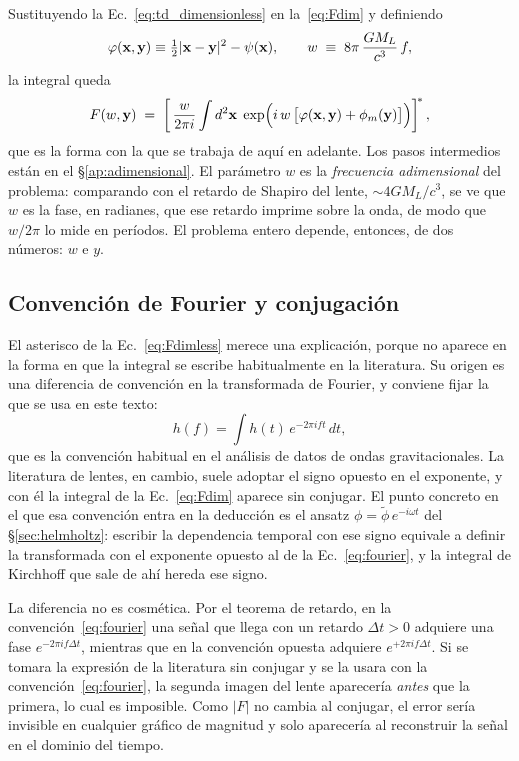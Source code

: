 \documentclass[11pt,a4paper,openany]{book}
\begin{document}
Sustituyendo la Ec.~\eqref{eq:td_dimensionless} en la~\eqref{eq:Fdim} y
definiendo
\begin{equation}
  \varphi(\vb x,\vb y)\equiv\tfrac12|\vb x-\vb y|^{2}-\psi(\vb x),
  \qquad
  w\;\equiv\;8\pi\,\frac{GM_L}{c^{3}}\,f ,
  \label{eq:wdef}
\end{equation}
la integral queda
\begin{equation}
  F(w,\vb y)\;=\;\left[\,\frac{w}{2\pi i}\int d^{2}\vb x\;
  \exp\!\Big(i\,w\,\big[\varphi(\vb x,\vb y)+\phi_m(\vb y)\big]\Big)\right]^{\!*} ,
  \label{eq:Fdimless}
\end{equation}
que es la forma con la que se trabaja de aqu\'i en adelante. Los pasos
intermedios est\'an en el \S\ref{ap:adimensional}. El par\'ametro $w$ es la
\emph{frecuencia adimensional} del problema: comparando con el retardo de
Shapiro del lente, $\sim4GM_L/c^{3}$, se ve que $w$ es la fase, en radianes,
que ese retardo imprime sobre la onda, de modo que $w/2\pi$ lo mide en
per\'iodos. El problema entero depende, entonces, de
dos n\'umeros: $w$ e $y$.

\subsection*{Convenci\'on de Fourier y conjugaci\'on}

El asterisco de la Ec.~\eqref{eq:Fdimless} merece una explicaci\'on, porque no
aparece en la forma en que la integral se escribe habitualmente en la
literatura. Su origen es una diferencia de convenci\'on en la transformada de
Fourier, y conviene fijar la que se usa en este texto:
\begin{equation}
  h(f)=\int h(t)\,e^{-2\pi i ft}\,dt ,
  \label{eq:fourier}
\end{equation}
que es la convenci\'on habitual en el an\'alisis de datos de ondas
gravitacionales. La literatura de lentes, en cambio, suele adoptar el signo
opuesto en el exponente, y con \'el la integral de la
Ec.~\eqref{eq:Fdim} aparece sin conjugar. El punto concreto en el que esa
convenci\'on entra en la deducci\'on es el ansatz
$\phi=\tilde\phi\,e^{-i\omega t}$ del \S\ref{sec:helmholtz}: escribir la
dependencia temporal con ese signo equivale a definir la transformada con el
exponente opuesto al de la Ec.~\eqref{eq:fourier}, y la integral de Kirchhoff
que sale de ah\'i hereda ese signo.

La diferencia no es cosm\'etica. Por el teorema de retardo, en la
convenci\'on~\eqref{eq:fourier} una se\~nal que llega con un retardo
$\Delta t>0$ adquiere una fase $e^{-2\pi i f\Delta t}$, mientras que en la
convenci\'on opuesta adquiere $e^{+2\pi i f\Delta t}$. Si se tomara la
expresi\'on de la literatura sin conjugar y se la usara con la
convenci\'on~\eqref{eq:fourier}, la segunda imagen del lente aparecer\'ia
\emph{antes} que la primera, lo cual es imposible. Como $|F|$ no cambia al
conjugar, el error ser\'ia invisible en cualquier gr\'afico de magnitud y solo
aparecer\'ia al reconstruir la se\~nal en el dominio del tiempo.
\end{document}
